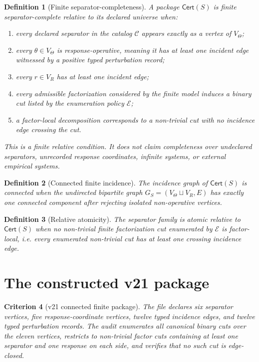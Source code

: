 \documentclass[11pt]{article}
\newtheorem{definition}{Definition}[section]
\newtheorem{criterion}[definition]{Criterion}
\newcommand{\VTheta}{V_{\Theta}}
\newcommand{\VR}{V_R}
\newcommand{\Cert}{\mathsf{Cert}}
\begin{document}
\begin{definition}[Finite separator-completeness]
A package $\Cert(S)$ is finite separator-complete relative to its declared universe when:
\begin{enumerate}[label=(\roman*)]
  \item every declared separator in the catalog $\mathcal C$ appears exactly as a vertex of $\VTheta$;
  \item every $\theta\in\VTheta$ is response-operative, meaning it has at least one incident edge witnessed by a positive typed perturbation record;
  \item every $r\in\VR$ has at least one incident edge;
  \item every admissible factorization considered by the finite model induces a binary cut listed by the enumeration policy $\mathcal E$;
  \item a factor-local decomposition corresponds to a non-trivial cut with no incidence edge crossing the cut.
\end{enumerate}
This is a finite relative condition. It does not claim completeness over undeclared separators, unrecorded response coordinates, infinite systems, or external empirical systems.
\end{definition}

\begin{definition}[Connected finite incidence]
The incidence graph of $\Cert(S)$ is connected when the undirected bipartite graph $G_S=(\VTheta\sqcup\VR,E)$ has exactly one connected component after rejecting isolated non-operative vertices.
\end{definition}

\begin{definition}[Relative atomicity]
The separator family is atomic relative to $\Cert(S)$ when no non-trivial finite factorization cut enumerated by $\mathcal E$ is factor-local, i.e. every enumerated non-trivial cut has at least one crossing incidence edge.
\end{definition}

\section{The constructed v21 package}

\begin{criterion}[v21 connected finite package]
The file  declares six separator vertices, five response-coordinate vertices, twelve typed incidence edges, and twelve typed perturbation records. The audit enumerates all canonical binary cuts over the eleven vertices, restricts to non-trivial factor cuts containing at least one separator and one response on each side, and verifies that no such cut is edge-closed.
\end{criterion}
\end{document}
